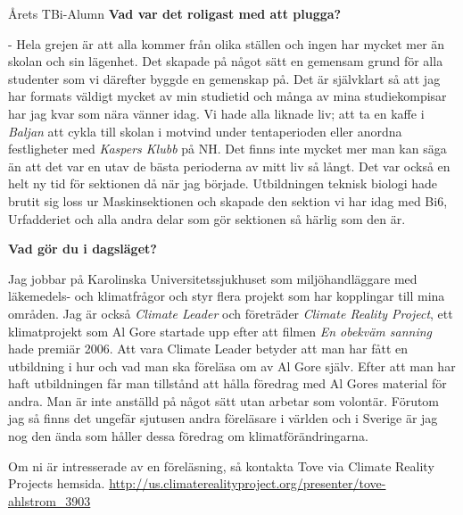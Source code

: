 \begin{news}{2}{Årets TBi-Alumn}{}{}{}{}
\textbf{Vad var det roligast med att plugga?}

 - Hela grejen är att alla kommer från olika ställen och ingen har mycket mer än 
skolan och sin lägenhet. Det skapade på något sätt en gemensam grund för alla 
studenter som vi därefter byggde en gemenskap på. Det är självklart så att 
jag har formats väldigt mycket av min studietid och många av mina 
studiekompisar har jag kvar som nära vänner idag. Vi hade alla liknade liv; 
att ta en kaffe i \emph{Baljan} att cykla till skolan i motvind under tentaperioden 
eller anordna festligheter med \emph{Kaspers Klubb} på NH. Det finns inte mycket mer 
man kan säga än att det var en utav de bästa perioderna av mitt liv så långt. 
Det var också en helt ny tid för sektionen då när jag började. Utbildningen 
teknisk biologi hade brutit sig loss ur Maskinsektionen och skapade den 
sektion vi har idag med Bi6, Urfadderiet och alla andra delar som gör 
sektionen så härlig som den är.  


\textbf{Vad gör du i dagsläget?}

Jag jobbar på Karolinska Universitetssjukhuset som miljöhandläggare med 
läkemedels- och klimatfrågor och styr flera projekt som har kopplingar till 
mina områden. Jag är också \emph{Climate Leader} och företräder \emph{Climate 
Reality Project}, ett klimatprojekt som Al Gore startade upp efter att filmen \emph{En 
obekväm sanning} hade premiär 2006. Att vara Climate Leader betyder att 
man har fått en utbildning i hur och vad man ska föreläsa om av Al Gore 
själv. Efter att man har haft utbildningen får man tillstånd att hålla 
föredrag med Al Gores material för andra. Man är inte anställd på något sätt 
utan arbetar som volontär. Förutom jag så finns det ungefär sjutusen andra 
föreläsare i världen och i Sverige är jag nog den ända som håller dessa 
föredrag om klimatförändringarna. 

Om ni är intresserade av en föreläsning, så kontakta Tove via Climate Reality 
Projects hemsida. \url{http://us.climaterealityproject.org/presenter/tove-
ahlstrom_3903}

\end{news}
